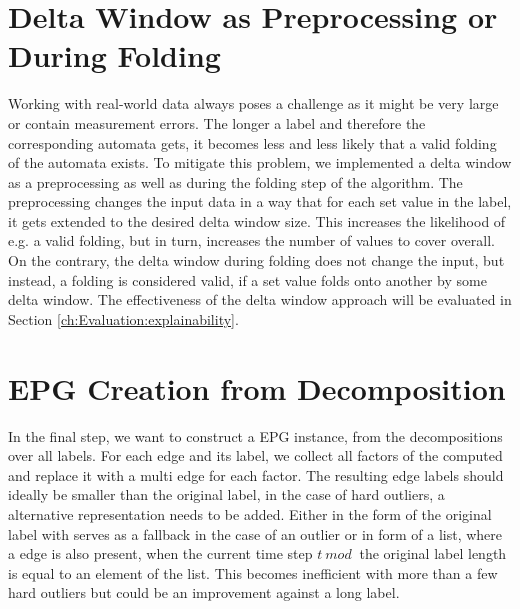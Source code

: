 \section{Delta Window as Preprocessing or During Folding}
\label{ch:novel-algos:delta-window}
Working with real-world data always poses a challenge as it might be very large or contain measurement errors.
The longer a label and therefore the corresponding automata gets, it becomes less and less likely that a valid folding of the automata exists.
To mitigate this problem, we implemented a delta window as a preprocessing as well as during the folding step of the algorithm.
The preprocessing changes the input data in a way that for each set value in the label, it gets extended to the desired delta window size.
This increases the likelihood of e.g. a valid folding, but in turn, increases the number of values to cover overall. On the contrary, the delta window during folding does not change the input, but instead, a folding is considered valid, if a set value folds onto another by some delta window.
The effectiveness of the delta window approach will be evaluated in Section \ref{ch:Evaluation:explainability}.

\section{EPG Creation from Decomposition}
\label{ch:novel-algos:ept-graph}
In the final step, we want to construct a EPG instance, from the decompositions over all labels.
For each edge and its label, we collect all factors of the computed \orDecomp and replace it with a multi edge for each factor.
The resulting edge labels should ideally be smaller than the original label, in the case of hard outliers, a alternative representation needs to be added.
Either in the form of the original label with serves as a fallback in the case of an outlier or in form of a list, where a edge is also present, when the current time step $t ~mod~$ the original label length is equal to an element of the list.
This becomes inefficient with more than a few hard outliers but could be an improvement against a long label.


